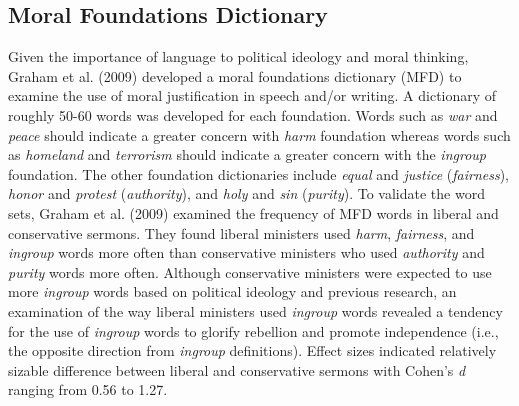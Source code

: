 \documentclass[english,man]{apa6}
\theoremstyle{definition}
\theoremstyle{definition}
\theoremstyle{definition}
\theoremstyle{remark}
\begin{document}
\subsection{Moral Foundations
Dictionary}\label{moral-foundations-dictionary}

Given the importance of language to political ideology and moral
thinking, Graham et al. (2009) developed a moral foundations dictionary
(MFD) to examine the use of moral justification in speech and/or
writing. A dictionary of roughly 50-60 words was developed for each
foundation. Words such as \emph{war} and \emph{peace} should indicate a
greater concern with \emph{harm} foundation whereas words such as
\emph{homeland} and \emph{terrorism} should indicate a greater concern
with the \emph{ingroup} foundation. The other foundation dictionaries
include \emph{equal} and \emph{justice} (\emph{fairness}), \emph{honor}
and \emph{protest} (\emph{authority}), and \emph{holy} and \emph{sin}
(\emph{purity}). To validate the word sets, Graham et al. (2009)
examined the frequency of MFD words in liberal and conservative sermons.
They found liberal ministers used \emph{harm}, \emph{fairness}, and
\emph{ingroup} words more often than conservative ministers who used
\emph{authority} and \emph{purity} words more often. Although
conservative ministers were expected to use more \emph{ingroup} words
based on political ideology and previous research, an examination of the
way liberal ministers used \emph{ingroup} words revealed a tendency for
the use of \emph{ingroup} words to glorify rebellion and promote
independence (i.e., the opposite direction from \emph{ingroup}
definitions). Effect sizes indicated relatively sizable difference
between liberal and conservative sermons with Cohen's \emph{d} ranging
from 0.56 to 1.27.
\end{document}
